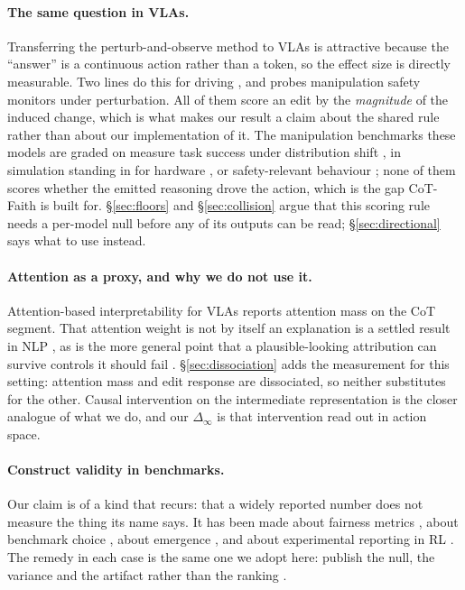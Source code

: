 \documentclass[11pt]{article}
\begin{document}
\paragraph{The same question in VLAs.} Transferring the perturb-and-observe method to VLAs \citep{openvla,rt2,octo,ecot,cotvla,ecotlite} is attractive because the ``answer'' is a continuous action rather than a token, so the effect size is directly measurable. Two lines do this for driving \citep{vladrivebench,pinocchio}, and \citet{doubleedged} probes manipulation safety monitors under perturbation. All of them score an edit by the \emph{magnitude} of the induced change, which is what makes our result a claim about the shared rule rather than about our implementation of it. The manipulation benchmarks these models are graded on measure task success under distribution shift \citep{colosseum,vlabench}, in simulation standing in for hardware \citep{simplerenv}, or safety-relevant behaviour \citep{liberosafety}; none of them scores whether the emitted reasoning drove the action, which is the gap CoT-Faith is built for. \S\ref{sec:floors} and \S\ref{sec:collision} argue that this scoring rule needs a per-model null before any of its outputs can be read; \S\ref{sec:directional} says what to use instead.

\paragraph{Attention as a proxy, and why we do not use it.} Attention-based interpretability for VLAs \citep{ecot,cotvla} reports attention mass on the CoT segment. That attention weight is not by itself an explanation is a settled result in NLP \citep{jain2019attention,wiegreffe2019,serrano2019}, as is the more general point that a plausible-looking attribution can survive controls it should fail \citep{adebayo2018,friedman2024}. \S\ref{sec:dissociation} adds the measurement for this setting: attention mass and edit response are dissociated, so neither substitutes for the other. Causal intervention on the intermediate representation \citep{rome,zhang2024patching} is the closer analogue of what we do, and our $\Delta_\infty$ is that intervention read out in action space.

\paragraph{Construct validity in benchmarks.} Our claim is of a kind that recurs: that a widely reported number does not measure the thing its name says. It has been made about fairness metrics \citep{jacobs2021}, about benchmark choice \citep{dehghani2021,raji2021}, about emergence \citep{schaeffer2023}, and about experimental reporting in RL \citep{henderson2018,dodge2019,pineau2021}. The remedy in each case is the same one we adopt here: publish the null, the variance and the artifact rather than the ranking \citep{lipton2016}.


\end{document}
